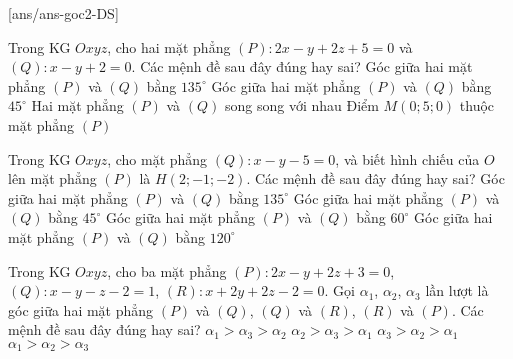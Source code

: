 \TNTF
{}[ans/ans-goc2-DS]
\begin{ex}%
	Trong KG $Oxyz$, cho hai mặt phẳng $(P)\colon 2x-y+2z+5=0$ và $(Q)\colon x-y+2=0$. Các mệnh đề sau đây đúng hay sai?
	\choiceTF
	{Góc giữa hai mặt phẳng $(P)$ và $(Q)$ bằng $135^\circ$}
	{\True Góc giữa hai mặt phẳng $(P)$ và $(Q)$ bằng $45^\circ$}
	{Hai mặt phẳng $(P)$ và $(Q)$ song song với nhau}
	{\True Điểm $M\left(0;5;0\right)$ thuộc mặt phẳng $(P)$}
\end{ex}
\begin{ex}%
	Trong KG $Oxyz$, cho mặt phẳng $(Q)\colon x-y-5=0$, và biết hình chiếu của $O$ lên mặt phẳng $(P)$ là $H\left(2;-1;-2\right)$. Các mệnh đề sau đây đúng hay sai?
	\choiceTF
	{Góc giữa hai mặt phẳng $(P)$ và $(Q)$ bằng $135^\circ$}
	{\True Góc giữa hai mặt phẳng $(P)$ và $(Q)$ bằng $45^\circ $}
	{Góc giữa hai mặt phẳng $(P)$ và $(Q)$ bằng $60^\circ $}
	{Góc giữa hai mặt phẳng $(P)$ và $(Q)$ bằng $120^\circ$}
\end{ex}
\begin{ex}%
	Trong KG $Oxyz$, cho ba mặt phẳng $(P)\colon 2x-y+2z+3=0$, $(Q)\colon x-y-z-2=1$, $(R)\colon x+2y+2z-2=0$. Gọi $\alpha_1$, $\alpha_2$, $\alpha_3$ lần lượt là góc giữa hai mặt phẳng $(P)$ và $(Q)$, $(Q)$ và $(R)$, $(R)$ và $(P)$. Các mệnh đề sau đây đúng hay sai?
	\choiceTF
	{\True $\alpha_1>\alpha_3>\alpha_2$}
	{$\alpha_2>\alpha_3>\alpha_1$}
	{$\alpha_3>\alpha_2>\alpha_1$}
	{$\alpha_1>\alpha_2>\alpha_3$}
\end{ex}

